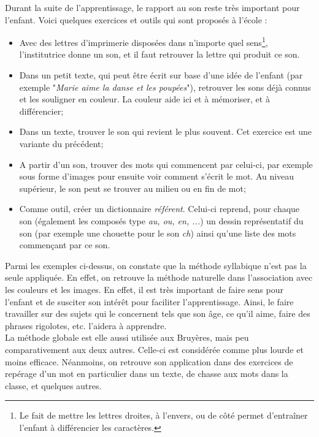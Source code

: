 Durant la suite de l'apprentissage, le rapport au son reste très important pour l'enfant. Voici quelques exercices et outils qui sont proposés à l'école :
\begin{itemize}
\item Avec des lettres d'imprimerie disposées dans n'importe quel sens\footnote{Le fait de mettre les lettres droites, à l'envers, ou de côté permet d'entraîner l'enfant à différencier les caractères.}, l'institutrice donne un son, et il faut retrouver la lettre qui produit ce son.
\item Dans un petit texte, qui peut être écrit sur base d'une idée de l'enfant (par exemple "\textit{Marie aime la danse et les poupées}"), retrouver les sons déjà connus et les souligner en couleur. La couleur aide ici et à mémoriser, et à différencier;
\item Dans un texte, trouver le son qui revient le plus souvent. Cet exercice est une variante du précédent;
\item A partir d'un son, trouver des mots qui commencent par celui-ci, par exemple sous forme d'images pour ensuite voir comment s'écrit le mot. Au niveau supérieur, le son peut se trouver au milieu ou en fin de mot;
\item Comme outil, créer un dictionnaire \textit{référent}. Celui-ci reprend, pour chaque son (également les composés type \textit{au, ou, en, ...}) un dessin représentatif du son (par exemple une chouette pour le son \textit{ch}) ainsi qu'une liste des mots commençant par ce son.\\
\end{itemize}

Parmi les exemples ci-dessus, on constate que la méthode syllabique n'est pas la seule appliquée. En effet, on retrouve la méthode naturelle dans l'association avec les couleurs et les images. En effet, il est très important de faire sens pour l'enfant et de susciter son intérêt pour faciliter l'apprentissage. Ainsi, le faire travailler sur des sujets qui le concernent tels que son âge, ce qu'il aime, faire des phrases rigolotes, etc. l'aidera à apprendre.\\

La méthode globale est elle aussi utilisée aux Bruyères, mais peu comparativement aux deux autres. Celle-ci est considérée comme plus lourde et moins efficace. Néanmoins, on retrouve son application dans des exercices de repérage d'un mot en particulier dans un texte, de chasse aux mots dans la classe, et quelques autres.\\

